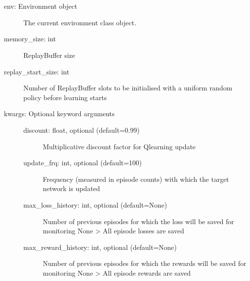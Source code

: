 \documentclass[letterpaper,10pt,english]{sphinxmanual}
\begin{document}
\begin{fulllineitems}
\label{\detokenize{MultiAgentMarketRL:trainer.DeepQTrainer}}~

\begin{fulllineitems}
\label{\detokenize{MultiAgentMarketRL:trainer.DeepQTrainer.__init__}}~\begin{description}
\item[{env: Environment object}] \leavevmode
\sphinxAtStartPar
The current environment class object.

\item[{memory\_size: int}] \leavevmode
\sphinxAtStartPar
ReplayBuffer size

\item[{replay\_start\_size: int}] \leavevmode
\sphinxAtStartPar
Number of ReplayBuffer slots to be initialised with a uniform random policy before learning starts

\item[{kwargs: Optional keyword arguments}] \leavevmode\begin{description}
\item[{discount: float, optional (default=0.99)}] \leavevmode
\sphinxAtStartPar
Multiplicative discount factor for Q\sphinxhyphen{}learning update

\item[{update\_frq: int, optional (default=100)}] \leavevmode
\sphinxAtStartPar
Frequency (measured in episode counts) with which the target network is updated

\item[{max\_loss\_history: int, optional (default=None)}] \leavevmode
\sphinxAtStartPar
Number of previous episodes for which the loss will be saved for monitoring
None \textendash{}\textgreater{} All episode losses are saved

\item[{max\_reward\_history: int, optional (default=None)}] \leavevmode
\sphinxAtStartPar
Number of previous episodes for which the rewards will be saved for monitoring
None \textendash{}\textgreater{} All episode rewards are saved


\end{description}
\end{description}
\end{fulllineitems}
\end{fulllineitems}
\end{document}
